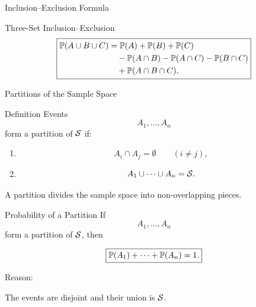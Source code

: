 \begin{frame}{Inclusion--Exclusion Formula}
\begin{keybox}{Three-Set Inclusion--Exclusion}
\[
\boxed{
\begin{aligned}
\mathbb{P}(A\cup B\cup C)
&=
\mathbb{P}(A)+\mathbb{P}(B)+\mathbb{P}(C)
\\
&\quad
-\mathbb{P}(A\cap B)
-\mathbb{P}(A\cap C)
-\mathbb{P}(B\cap C)
\\
&\quad
+\mathbb{P}(A\cap B\cap C).
\end{aligned}
}
\]
\end{keybox}
\end{frame}



\begin{frame}{Partitions of the Sample Space}
\begin{keybox}{Definition}
Events
\[
A_1,\dots,A_n
\]
form a partition of $\mathcal{S}$ if:

\begin{enumerate}
    \item
    \[
    A_i\cap A_j=\emptyset
    \qquad (i\neq j),
    \]

    \item
    \[
    A_1\cup\cdots\cup A_n=\mathcal{S}.
    \]
\end{enumerate}
\end{keybox}

\vspace{0.25cm}

A partition divides the sample space into non-overlapping pieces.
\end{frame}











\begin{frame}{Probability of a Partition}
If
\[
A_1,\dots,A_n
\]
form a partition of $\mathcal{S}$, then

\[
\boxed{
\mathbb{P}(A_1)+\cdots+\mathbb{P}(A_n)=1.
}
\]

\vspace{0.25cm}

Reason:

The events are disjoint and their union is $\mathcal{S}$.
\end{frame}


